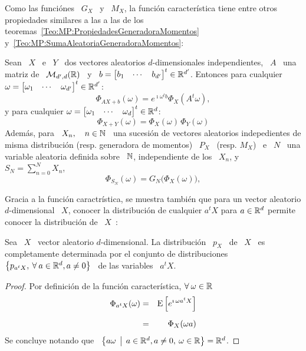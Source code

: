 {Como las  funci\'ones \ $G_X$ \  y \ $M_X$, la  funci\'on caracter\'istica tiene
entre    otros    propiedades    similares     a    las    a    las    de    los
teoremas~\ref{Teo:MP:PropiedadesGeneradoraMomentos}
y~\ref{Teo:MP:SumaAleatoriaGeneradoraMomentos}:
%
\begin{teorema}%
\label{Teo:MP:PropiedadesFuncionCaracteristica}
%
  Sean  \   $X$  \  e  \   $Y$  \  dos   vectores  aleatorios  $d$-dimensionales
  independientes,  \ $A$  \ una  matriz de  \  $\mathcal{M}_{d',d}(\mathbb{R})$ \  y \  $b
  =  \begin{bmatrix} b_1  &  \cdots &  b_{d'}  \end{bmatrix}^t \in  \mathbb{R}^{d'}$.
  Entonces  para  cualquier  $\omega  =  \begin{bmatrix}  \omega_1  &  \cdots  &
    \omega_{d'} \end{bmatrix}^t \in \mathbb{R}^{d'}$:
  \[
  \Phi_{A X + b}(\omega) =  e^{\imath \omega^t b} \Phi_X\left( A^t \omega \right),
  \]
  y   para   cualquier  $\omega   =   \begin{bmatrix}   \omega_1   &  \cdots   &
    \omega_d \end{bmatrix}^t \in \mathbb{R}^d$:
  \[
  \Phi_{X+Y}(\omega) = \Phi_X(\omega) \, \Phi_Y(\omega)
  \]
  Adem\'as,  para \  $X_n, \quad  n  \in \mathbb{N}$  \, una  sucesi\'on de  vectores
  aleatorios  indepedientes  de   misma  distribuci\'on  (resp.   generadora  de
  momentos) \ $P_X$ \ (resp. $M_X$) \  e \ $N$ \ una variable aleatoria definida
  sobre \ $\mathbb{N}$, independiente de los \ $X_n$, y \ $ S_N = \sum_{n=0}^N X_n$,
  \[
  \Phi_{S_N}(\omega) =  G_N \big( \Phi_X(\omega) \big),
  \]
\end{teorema}

Gracia a la  funci\'on caractr\'istica, se muestra tambi\'en  que para un vector
aleatorio $d$-dimensional \ $X$, conocer  la distribuci\'on de cualquier $a^t X$
para $a  \in \mathbb{R}^d$  permite conocer la  distribuci\'on de  \ $X$~\cite{Mui82,
  Sas13}:
%
\begin{teorema}
  Sea \ $X$ \ vector aleatorio $d$-dimensional. La distribuci\'on \ $p_X$ \ de \
  $X$  \  es completamente  determinada  por  el  conjunto de  distribuciones  \
  $\left\{ p_{a^t X},  \: \forall \: a \in  \mathbb{R}^d, a \ne 0 \right\}$  \ de las
  variables \ $a^t X$.
\end{teorema}
%
\begin{proof}
  Por definici\'on  de la funci\'on caracter\'istica, $\forall \: \omega \in \mathbb{R}$
  \begin{eqnarray*}
  \Phi_{a^t X}(\omega) & = & \operatorname{E}\left[ e^{\imath \, \omega a^t X} \right]\\[2mm]
  & = & \Phi_X(\omega a)
  \end{eqnarray*}
  Se concluye  notando que \ $\left\{  a \omega \:\: \big| \:\: a  \in \mathbb{R}^d, a  \ne 0, \:
    \omega \in \mathbb{R} \right\} = \mathbb{R}^d$.
\end{proof}

}

